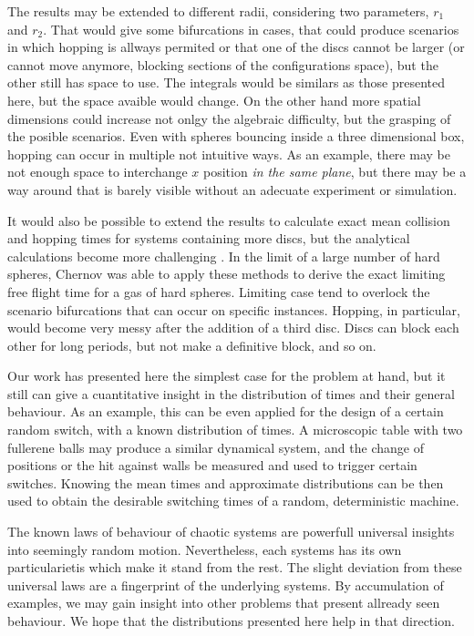 \documentclass[superscriptaddress,pre,reprint,showpacs,twocolumn]{revtex4-1}
\begin{document}
The results may be extended to different radii, considering two parameters,
$r_1$ and $r_2$. That would give some bifurcations in cases, that could
produce scenarios in which hopping is allways permited or that one of the
discs cannot be larger (or cannot move anymore,
blocking sections of the configurations space), but the other still has space to use.
The integrals would be similars as those presented here, but the space avaible
would change. 
On the other hand more spatial dimensions could increase not
onlgy the algebraic difficulty, but the grasping of the posible scenarios.
Even with spheres bouncing inside a three dimensional box,
hopping can occur in multiple not intuitive ways. As an example,
there may be not enough space to interchange $x$ position
\emph{in the same plane}, but there may be a way around that
is barely visible without an adecuate experiment or
simulation.


It would also be possible to extend the results to calculate exact mean collision
and hopping times for systems containing more discs,
but the analytical calculations become more challenging \cite{three_hard_discs_2004}.
In the limit of a large number of hard spheres, Chernov \cite{Chernov97}
was able to apply these methods to derive the exact limiting  free flight time for a gas of hard spheres. Limiting case tend to overlock the scenario bifurcations that
can occur on specific instances. Hopping, in particular, would become very
messy after the addition of a third disc. Discs can block each other for long periods,
but not make a definitive block, and so on.

Our work has presented here the simplest case for the problem at hand, but it still
can give a cuantitative insight in the distribution of times and their
general behaviour. As an example, this can be even applied for the design of a certain
random switch, with a known distribution of times. A microscopic table with two
fullerene balls may produce a similar dynamical system, and the change of positions
or the hit against walls be measured and used to trigger certain switches. 
Knowing the mean times and approximate distributions can be then used
to obtain the desirable switching times of a random, deterministic machine.

The known laws of behaviour of chaotic systems are powerfull universal insights
into seemingly random motion. Nevertheless, each systems has its own
particularietis which make it stand from the rest. The slight deviation from
these universal laws are a fingerprint of the underlying systems. By
accumulation of examples, we may gain insight into other problems that
present allready seen behaviour. We hope that the distributions presented here
help in that direction. 
\end{document}
